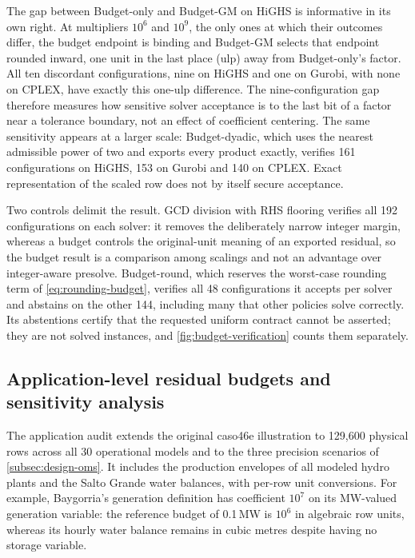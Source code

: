 \documentclass[11pt]{article}
\theoremstyle{definition}
\theoremstyle{remark}
\begin{document}
The gap between Budget-only and Budget-GM on HiGHS is informative in its own right. At
multipliers $10^6$ and $10^9$, the only ones at which their outcomes differ, the budget endpoint
is binding and Budget-GM selects that endpoint rounded inward, one unit in the last place (ulp)
away from Budget-only's factor. All ten discordant configurations, nine on HiGHS and one on Gurobi,
with none on CPLEX, have exactly this one-ulp difference. The nine-configuration gap therefore measures how
sensitive solver acceptance is to the last bit of a factor near a tolerance boundary, not an
effect of coefficient centering. The same sensitivity appears at a larger scale: Budget-dyadic,
which uses the nearest admissible power of two and exports every product exactly, verifies 161
configurations on HiGHS, 153 on Gurobi and 140 on CPLEX. Exact representation of the scaled row does not by
itself secure acceptance.

Two controls delimit the result. GCD division with RHS flooring verifies all 192 configurations
on each solver: it removes the deliberately narrow integer margin, whereas a budget controls
the original-unit meaning of an exported residual, so the budget result is a comparison among
scalings and not an advantage over integer-aware presolve. Budget-round, which reserves the
worst-case rounding term of \eqref{eq:rounding-budget}, verifies all 48 configurations it
accepts per solver and abstains on the other 144, including many that other policies solve
correctly. Its abstentions certify that the requested uniform contract cannot be asserted; they
are not solved instances, and \cref{fig:budget-verification} counts them separately.

\subsection{Application-level residual budgets and sensitivity analysis}
\label{subsec:results-application}
The application audit extends the original caso46e illustration to 129,600 physical rows
across all 30 operational models and to the three precision scenarios of
\cref{subsec:design-oms}. It includes the production envelopes of all modeled hydro plants
and the Salto Grande water balances, with per-row unit conversions. For example,
Baygorria's generation definition has coefficient $10^7$ on its MW-valued generation
variable: the reference budget of 0.1\,MW is $10^6$ in algebraic row units, whereas its
hourly water balance remains in cubic metres despite having no storage variable.
\end{document}
